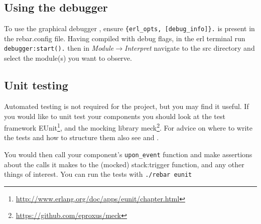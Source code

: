 \documentclass[a4paper]{article}
\begin{document}

\subsection{Using the debugger} %
\label{sub:using_the_debugger}

To use the graphical debugger \cite{manual_debugger}, ensure
\verb!{erl_opts, [debug_info]}.! is present in the rebar.config file.
Having compiled with debug flags, in the erl terminal run \verb!debugger:start().!
then in \emph{Module$\rightarrow$Interpret} navigate to the src directory and select the
module(s) you want to observe.


\subsection{Unit testing} %
\label{sub:unit_testing}

Automated testing is not required for the project, but you may find it useful.
If you would like to unit test your components you should look at the test
framework
EUnit\footnote{\url{http://www.erlang.org/doc/apps/eunit/chapter.html}}, and
the mocking library meck\footnote{\url{https://github.com/eproxus/meck}}. For
advice on where to write the tests and how to structure them also see
\cite{mochimedia_test} and \cite{so_eunit_q}.

You would then call your component's \verb!upon_event! function and make
assertions about the calls it makes to the (mocked) stack:trigger function,
and any other things of interest. You can run the tests with
\verb!./rebar eunit!


\end{document}
